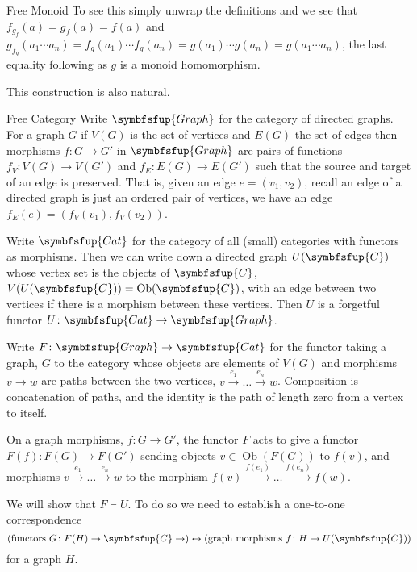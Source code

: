 \documentclass[fleqn]{NotesClass}
\makeatletter
\newcommand{\cat}[1]{\symbfsfup{#1}}
\newcommand{\c@egory}[1]{\symbfsfup{#1}}
\newcommand{\Cat}{\c@egory{Cat}}
\newcommand{\Graph}{\c@egory{Graph}}
\DeclareMathOperator{\Ob}{Ob}
\newcommand{\leftadjoint}{\vdash}
\makeatother
\begin{document}
\begin{appendices}
\begin{exm}{Free Monoid}{}
            To see this simply unwrap the definitions and we see that \(f_{g_f}(a) = g_f(a) = f(a)\) and \(g_{f_g}(a_1 \dotsm a_n) = f_g(a_1)\dotsm f_g(a_n) = g(a_1)\dotsm g(a_n) = g(a_1 \dotsm a_n)\), the last equality following as \(g\) is a monoid homomorphism.
            
            This construction is also natural.
        \end{exm}
        
        \begin{exm}{Free Category}{}
            Write \(\Graph\) for the category of directed graphs.
            For a graph \(G\) if \(V(G)\) is the set of vertices and \(E(G)\) the set of edges then morphisms \(f\colon G \to G'\) in \(\Graph\) are pairs of functions \(f_V \colon V(G) \to V(G')\) and \(f_E \colon E(G) \to E(G')\) such that the source and target of an edge is preserved.
            That is, given an edge \(e = (v_1, v_2)\), recall an edge of a directed graph is just an ordered pair of vertices, we have an edge \(f_E(e) = (f_V(v_1), f_V(v_2))\).
            
            Write \(\Cat\) for the category of all (small) categories with functors as morphisms.
            Then we can write down a directed graph \(U(\cat{C})\) whose vertex set is the objects of \(\cat{C}\), \(V(U(\cat{C})) = \Ob(\cat{C})\), with an edge between two vertices if there is a morphism between these vertices.
            Then \(U\) is a forgetful functor \(U \colon \Cat \to \Graph\).
            
            Write \(F \colon \Graph \to \Cat\) for the functor taking a graph, \(G\) to the category whose objects are elements of \(V(G)\) and morphisms \(v \to w\) are paths between the two vertices, \(v \xrightarrow{e_1} \dotso \xrightarrow{e_n} w\).
            Composition is concatenation of paths, and the identity is the path of length zero from a vertex to itself.
            
            On a graph morphisms, \(f \colon G \to G'\), the functor \(F\) acts to give a functor \(F(f) \colon F(G) \to F(G')\) sending objects \(v \in \Ob(F(G))\) to \(f(v)\), and morphisms \(v \xrightarrow{e_1} \dotso \xrightarrow{e_n} w\) to the morphism \(f(v) \xrightarrow{f(e_1)} \dotso \xrightarrow{f(e_n)} f(w)\).
            
            We will show that \(F \leftadjoint U\).
            To do so we need to establish a one-to-one correspondence
            \begin{equation}
                (\text{functors } G \colon F(H) \to \cat{C} \to) \leftrightarrow (\text{graph morphisms } f \colon H \to U(\cat{C}))
            \end{equation}
            for a graph \(H\).
            

\end{exm}
\end{appendices}
\end{document}
